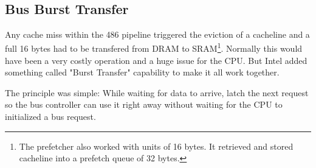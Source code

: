 \par
{}
\par
{}\\
\par




\subsection{Bus Burst Transfer}
Any cache miss within the 486 pipeline triggered the eviction of a cacheline and a full 16 bytes had to be transfered from DRAM to SRAM\footnote{The prefetcher also worked with units of 16 bytes. It retrieved and stored cacheline into a prefetch queue of 32 bytes.}. Normally this would have been a very costly operation and a huge issue for the CPU. But Intel added something called "Burst Transfer" capability to make it all work together.\\
\par
The principle was simple: While waiting for data to arrive, latch the next request so the bus controller can use it right away without waiting for the CPU to initialized a bus request.\\
\par
{}







